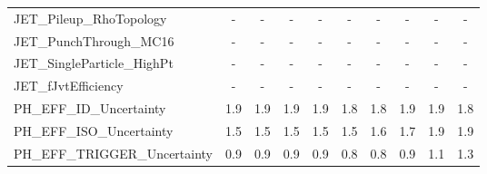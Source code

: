 \begin{table}[htbp]
{\begin{tabular}{l | ccccccccc}
JET\_Pileup\_RhoTopology                    &    - &    - &    - &    - &    - &    - &    - &    - &    - \\
JET\_PunchThrough\_MC16                     &    - &    - &    - &    - &    - &    - &    - &    - &    - \\
JET\_SingleParticle\_HighPt                 &    - &    - &    - &    - &    - &    - &    - &    - &    - \\
JET\_fJvtEfficiency                        &    - &    - &    - &    - &    - &    - &    - &    - &    - \\
PH\_EFF\_ID\_Uncertainty                     &  1.9 &  1.9 &  1.9 &  1.9 &  1.8 &  1.8 &  1.9 &  1.9 &  1.8 \\
PH\_EFF\_ISO\_Uncertainty                    &  1.5 &  1.5 &  1.5 &  1.5 &  1.5 &  1.6 &  1.7 &  1.9 &  1.9 \\
PH\_EFF\_TRIGGER\_Uncertainty                &  0.9 &  0.9 &  0.9 &  0.9 &  0.8 &  0.8 &  0.9 &  1.1 &  1.3 \\
\end{tabular}
}
\end{table}

